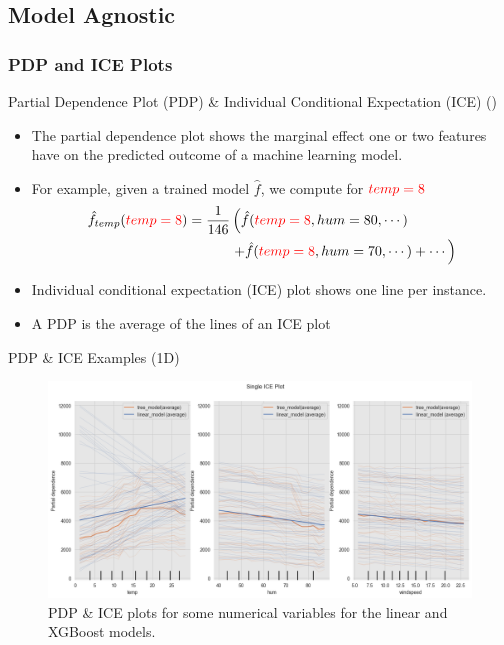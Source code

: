 \documentclass[10pt]{beamer}
\begin{document}
\subsection{Model Agnostic}

\subsubsection{PDP and ICE Plots}

\begin{frame}{Partial Dependence Plot (PDP) \& Individual Conditional Expectation (ICE) (\cite[Section 8.1 \& 9.1]{molnar2019})}
\begin{itemize}
\item The partial dependence plot shows the marginal effect one or two features have on the predicted outcome of a machine learning model. 
\item For example, given a trained model $\hat{f}$, we compute for $\textcolor{red}{temp=8}$
\begin{align*}
\hat{f}_{temp}(\textcolor{red}{temp=8}) = 
\frac{1}{146}
& \left(\hat{f}(\textcolor{red}{temp=8}, hum=80, \cdots) \right.\\
& \left. + \hat{f}(\textcolor{red}{temp=8}, hum=70, \cdots)  + \cdots \right)
\end{align*}
\pause
\item Individual conditional expectation (ICE) plot shows one line per instance. 
\item A PDP is the average of the lines of an ICE plot
\end{itemize}
\end{frame}

\begin{frame}{PDP \& ICE Examples (1D)}
\begin{center}
  \begin{figure}
    \includegraphics[scale=0.35]{images/interpretable_ml_99_0.png}
    \caption{PDP \& ICE plots for some numerical variables for the linear and XGBoost models.}\label{fig:pdp-ice}
  \end{figure}
\end{center}
\end{frame}
\end{document}
